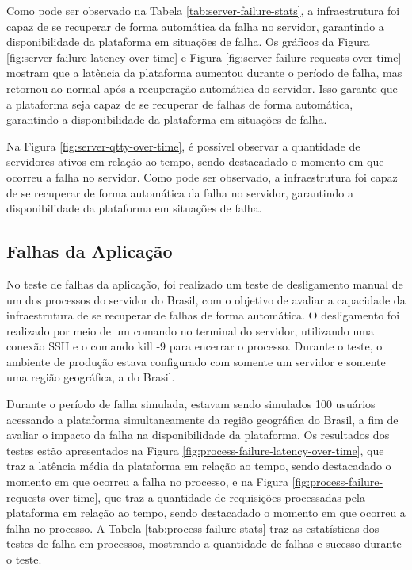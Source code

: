 Como pode ser observado na Tabela \ref{tab:server-failure-stats}, a infraestrutura foi capaz de se recuperar de forma automática da falha no servidor, garantindo a disponibilidade da plataforma em situações de falha. Os gráficos da Figura \ref{fig:server-failure-latency-over-time} e Figura \ref{fig:server-failure-requests-over-time} mostram que a latência da plataforma aumentou durante o período de falha, mas retornou ao normal após a recuperação automática do servidor. Isso garante que a plataforma seja capaz de se recuperar de falhas de forma automática, garantindo a disponibilidade da plataforma em situações de falha.

Na Figura \ref{fig:server-qtty-over-time}, é possível observar a quantidade de servidores ativos em relação ao tempo, sendo destacadado o momento em que ocorreu a falha no servidor. Como pode ser observado, a infraestrutura foi capaz de se recuperar de forma automática da falha no servidor, garantindo a disponibilidade da plataforma em situações de falha.

\subsection{Falhas da Aplicação}

No teste de falhas da aplicação, foi realizado um teste de desligamento manual de um dos processos do servidor do Brasil, com o objetivo de avaliar a capacidade da infraestrutura de se recuperar de falhas de forma automática. 
O desligamento foi realizado por meio de um comando no terminal do servidor, utilizando uma conexão SSH e o comando kill -9 para encerrar o processo. Durante o teste, o ambiente de produção estava configurado com somente um servidor e somente uma região geográfica, a do Brasil. 

Durante o período de falha simulada, estavam sendo simulados 100 usuários acessando a plataforma simultaneamente da região geográfica do Brasil, a fim de avaliar o impacto da falha na disponibilidade da plataforma. Os resultados dos testes estão apresentados na Figura \ref{fig:process-failure-latency-over-time}, que traz a latência média da plataforma em relação ao tempo, sendo destacadado o momento em que ocorreu a falha no processo, e na Figura \ref{fig:process-failure-requests-over-time}, que traz a quantidade de requisições processadas pela plataforma em relação ao tempo, sendo destacadado o momento em que ocorreu a falha no processo. A Tabela \ref{tab:process-failure-stats} traz as estatísticas dos testes de falha em processos, mostrando a quantidade de falhas e sucesso durante o teste.

